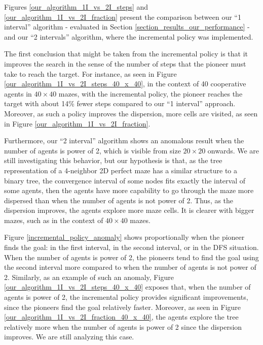 Figures \ref{our_algorithm_1I_vs_2I_steps} and \ref{our_algorithm_1I_vs_2I_fraction} present the comparison between our ``1 interval'' algorithm - evaluated in Section \ref{section_results_our_performance} - and our ``2 intervals'' algorithm, where the incremental policy was implemented.

The first conclusion that might be taken from the incremental policy is that it improves the search in the sense of the number of steps that the pioneer must take to reach the target. For instance, as seen in Figure \ref{our_algorithm_1I_vs_2I_steps_40_x_40}, in the context of 40 cooperative agents in $40 \times 40$ mazes, with the incremental policy, the pioneer reaches the target with about 14\% fewer steps compared to our ``1 interval'' approach. Moreover, as such a policy improves the dispersion, more cells are visited, as seen in Figure \ref{our_algorithm_1I_vs_2I_fraction}.

Furthermore, our ``2 interval'' algorithm shows an anomalous result when the number of agents is power of 2, which is visible from size $20 \times 20$ onwards. We are still investigating this behavior, but our hypothesis is that, as the tree representation of a 4-neighbor 2D perfect maze has a similar structure to a binary tree, the convergence interval of some nodes fits exactly the interval of some agents, then the agents have more capability to go through the maze more dispersed than when the number of agents is not power of 2. Thus, as the dispersion improves, the agents explore more maze cells. It is clearer with bigger mazes, such as in the context of $40 \times 40$ mazes. 

Figure \ref{incremental_policy_anomaly} shows proportionally when the pioneer finds the goal: in the first interval, in the second interval, or in the DFS situation. When the number of agents is power of 2, the pioneers tend to find the goal using the second interval more compared to when the number of agents is not power of 2. Similarly, as an example of such an anomaly, Figure \ref{our_algorithm_1I_vs_2I_steps_40_x_40} exposes that, when the number of agents is power of 2, the incremental policy provides significant improvements, since the pioneers find the goal relatively faster. Moreover, as seen in Figure \ref{our_algorithm_1I_vs_2I_fraction_40_x_40}, the agents explore the tree relatively more when the number of agents is power of 2 since the dispersion improves. We are still analyzing this case.

